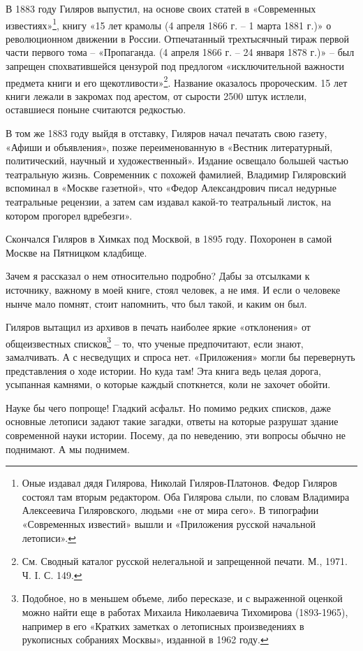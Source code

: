 В 1883 году Гиляров выпустил, на основе своих статей в «Современных известиях»\footnote{Оные издавал дядя Гилярова, Николай Гиляров-Платонов. Федор Гиляров состоял там вторым редактором. Оба Гилярова слыли, по словам Владимира Алексеевича Гиляровского, людьми «не от мира сего». В типографии «Современных известий» вышли и «Приложения русской начальной летописи».}, книгу «15 лет крамолы (4 апреля 1866 г. – 1 марта 1881 г.)» о революционном движении в России. Отпечатанный трехтысячный тираж первой части первого тома – «Пропаганда. (4 апреля 1866 г. – 24 января 1878 г.)» – был запрещен спохватившейся цензурой под предлогом «исключительной важности предмета книги и его щекотливости»\footnote{См. Сводный каталог русской нелегальной и запрещенной печати. М., 1971. Ч. I. С. 149.}. Название оказалось пророческим. 15 лет книги лежали в закромах под арестом, от сырости 2500 штук истлели, оставшиеся поныне считаются редкостью.

В том же 1883 году выйдя в отставку, Гиляров начал печатать свою газету, «Афиши и объявления», позже переименованную в «Вестник литературный, политический, научный и художественный». Издание освещало большей частью театральную жизнь. Современник с похожей фамилией, Владимир Гиляровский вспоминал в «Москве газетной», что «Федор Александрович писал недурные театральные рецензии, а затем сам издавал какой-то театральный листок, на котором прогорел вдребезги».

Скончался Гиляров в Химках под Москвой, в 1895 году. Похоронен в самой Москве на Пятницком кладбище.

Зачем я рассказал о нем относительно подробно? Дабы за отсылками к источнику, важному в моей книге, стоял человек, а не имя. И если о человеке нынче мало помнят, стоит напомнить, что был такой, и каким он был.

Гиляров вытащил из архивов в печать наиболее яркие «отклонения» от общеизвестных списков\footnote{Подобное, но в меньшем объеме, либо пересказе, и с выраженной оценкой можно найти еще в работах Михаила Николаевича Тихомирова (1893-1965), например в  его «Кратких заметках о летописных произведениях в рукописных собраниях Москвы», изданной в 1962 году.} – то, что ученые предпочитают, если знают, замалчивать. А с несведущих и спроса нет. «Приложения» могли бы перевернуть представления о ходе истории. Но куда там! Эта книга ведь целая дорога, усыпанная камнями, о которые каждый споткнется, коли не захочет обойти.

Науке бы чего попроще! Гладкий асфальт. Но помимо редких списков, даже основные летописи задают такие загадки, ответы на которые разрушат здание современной науки истории. Посему, да по неведению, эти вопросы обычно не поднимают. А мы поднимем. 
